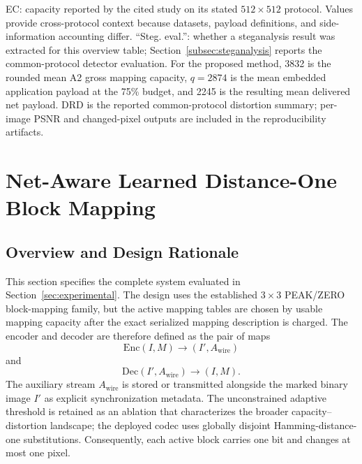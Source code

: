 \begin{table}[t]
{\footnotesize\RaggedRight EC: capacity reported by the cited study on its stated
$512\times512$ protocol. Values provide cross-protocol context because
datasets, payload definitions, and side-information accounting differ.
``Steg. eval.'': whether a steganalysis result was extracted for this overview
table; Section~\ref{subsec:steganalysis} reports the common-protocol detector
evaluation. For the proposed method, 3832 is the rounded mean A2 gross mapping
capacity, $q=2874$ is the mean embedded application payload at the 75\% budget,
and 2245 is the resulting mean delivered net payload. DRD is the reported
common-protocol distortion summary; per-image PSNR and changed-pixel outputs are
included in the reproducibility artifacts.\par}
\RevisionAddEnd
\end{table}



\section{Net-Aware Learned Distance-One Block Mapping}
\label{sec:proposedmethod}

\subsection{Overview and Design Rationale}

This section specifies the complete system evaluated in
Section~\ref{sec:experimental}. The design uses the established
$3\times3$ PEAK/ZERO block-mapping family, but the active mapping tables are
chosen by usable mapping capacity after the exact serialized mapping description is
charged. The encoder and decoder are therefore defined as the pair of maps
\begin{equation}
\mathrm{Enc}(I,M)\rightarrow(I',A_{\mathrm{wire}})
\label{eq:encoder-contract}
\end{equation}
and
\begin{equation}
\mathrm{Dec}(I',A_{\mathrm{wire}})\rightarrow(I,M).
\label{eq:decoder-contract}
\end{equation}
The auxiliary stream $A_{\mathrm{wire}}$ is stored or transmitted alongside the
marked binary image $I'$ as explicit synchronization metadata. The
unconstrained adaptive threshold is retained as an ablation that characterizes
the broader capacity--distortion landscape; the deployed codec uses globally
disjoint Hamming-distance-one substitutions. Consequently, each active block
carries one bit and changes at most one pixel.

